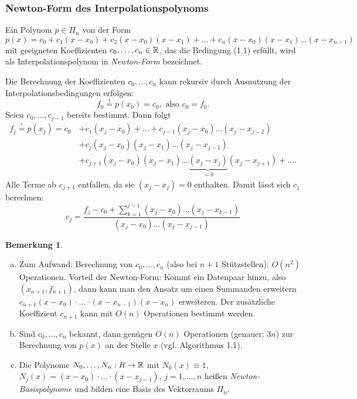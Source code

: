 \documentclass[
 a4paper,
 12pt,
 parskip=half
 ]{scrartcl}
\numberwithin{equation}{section}
\theoremstyle{plain}
\theoremstyle{definition}
\newtheorem{rmrk}{Bemerkung}[section] %
\numberwithin{equation}{section}
\begin{document}
\subsubsection{Newton-Form des Interpolationspolynoms}
Ein Polynom $p \in \Pi_n$ von der Form 
\[ p(x) = c_0 + c_1(x-x_0) + c_2(x-x_0)(x-x_1) + \ldots + c_n (x-x_0)(x-x_1) \ldots (x-x_{n-1}) \] mit geeigneten Koeffizienten $c_0, \ldots, c_n \in \mathbb{R}$, das die Bedingung (1.1) erfüllt, wird als Interpolationspolynom in \emph{Newton-Form} bezeichnet.

Die Berechnung der Koeffizienten $c_0, \ldots, c_n$ kann rekursiv durch Ausnutzung der Interpolationsbedingungen erfolgen:
\[ f_0 \overset{!}{=} p(x_0) = c_0, \text{ also } c_0 = f_0. \] 
Seien $c_0, \ldots, c_{j-1}$ bereits bestimmt. Dann folgt
\begin{align*}
 f_j \overset{!}{=} p(x_j) = c_0\, &+ c_1 (x_j-x_0) + \ldots + c_{j-1} (x_j-x_0) \ldots (x_j-x_{j-2}) \\
   &+ c_j (x_j-x_0)(x_j-x_1) \ldots (x_j-x_{j-1}) \\
   &+ c_{j+1} (x_j-x_0)(x_j-x_1) \ldots \underbrace{(x_j-x_j)}_{=0}(x_j-x_{j+1} ) + \ldots . 
\end{align*}
Alle Terme ab $c_{j+1}$ entfallen, da sie $(x_j-x_j)=0$ enthalten. Damit lässt sich $c_j$ berechnen:
\[ c_j = \frac{f_j - c_0 + \sum_{k=1}^{j-1}(x_j-x_0)\ldots(x_j-x_{k-1})}{(x_j-x_0) \ldots (x_j-x_{j-1})} \]

\begin{rmrk}
 \begin{enumerate}[(a)]
  \item Zum Aufwand: Berechnung von $c_0, \ldots, c_n$ (also bei $n+1$ Stütz\-stellen): $O(n^2)$ Operationen. Vorteil der Newton-Form: Kommt ein Datenpaar hinzu, also $(x_{n+1}, f_{n+1})$, dann kann man den Ansatz um einen Summanden erweitern $c_{n+1}( x-x_0 ) \cdot \ldots \cdot (x - x_{n-1})(x - x_n)$ erweiteren. Der zusätzliche Koeffizient $c_{n+1}$ kann mit $O(n)$ Operationen bestimmt werden.
  \item Sind $c_0, \ldots, c_n$ bekannt, dann genügen $O(n)$ Operationen (genauer: $3n$) zur Berechnung von $p(x)$ an der Stelle $x$ (vgl. Algorithmus 1.1).
  \item Die Polynome $N_0, \ldots, N_n:R \to \mathbb{R}$ mit $N_0(x) \equiv 1$, $N_j(x) = (x-x_0) \cdot \ldots \cdot (x - x_{j-1})$, $j = 1, \ldots, n$ heißen \emph{Newton-Basispolynome} und bilden eine Basis des Vektorraums $\Pi_n$.
 \end{enumerate}
\end{rmrk}
\end{document}
